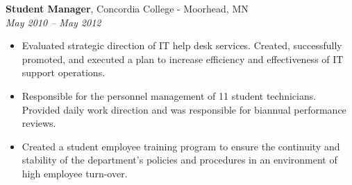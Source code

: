 {\bf Student Manager}, Concordia College - Moorhead, MN\\
{\it May 2010 – May 2012}
\begin{itemize}
	\item Evaluated strategic direction of IT help desk services.  Created, successfully promoted, and executed a plan to increase efficiency and effectiveness of IT support operations.
	\item Responsible for the personnel management of 11 student technicians.  Provided daily work direction and was responsible for biannual performance reviews.
	\item Created a student employee training program to ensure the continuity and stability of the department’s policies and procedures in an environment of high employee turn-over.
\end{itemize}